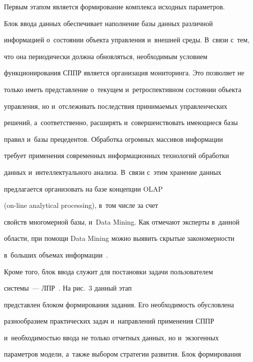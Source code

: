 

  


  Первым этапом является формирование комплекса исходных параметров. 


Блок ввода данных обеспечивает наполнение базы данных различной 


информацией о~со\-сто\-янии объекта управ\-ле\-ния и~внешней среды. В~связи с~тем, 


что она периодически должна обновляться, необходимым условием 


функционирования СППР является организация мониторинга. Это позволяет не 


только иметь представление о~текущем и~ретроспективном состоянии объекта 


управления, но и~отслеживать по\-след\-ст\-вия принимаемых управленческих 


решений, а~соответственно, расширять и~совершенствовать имеющиеся базы 


правил и~базы прецедентов. Обработка огромных массивов информации 


требует применения современных информационных технологий обработки 


данных и~интеллектуального анализа. В~связи с~этим хранение данных 


предлагается организовать на базе концепции OLAP


(on-line analytical processing), в~том числе за счет 


свойств многомерной базы, и~Data Mining. Как отмечают эксперты в~данной 


об\-ласти, при помощи Data Mining можно выявить скрытые за\-ко\-но\-мер\-ности 


в~больших объемах информации~\cite{7-or}. 




  Кроме того, блок ввода служит для постановки задачи пользователем 


сис\-те\-мы~--- ЛПР~\cite{8-or}. На рис.~3 данный этап 


представлен блоком формирования задания. Его необходимость обуслов\-ле\-на 


разнообразием практических задач и~на\-прав\-ле\-ний применения СППР 


и~необходимостью ввода не только отчетных данных, но и~экзогенных 


параметров модели, а~также выбором стратегии развития. Блок формирования 


